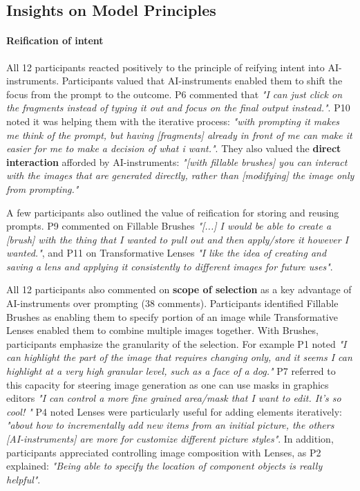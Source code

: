 \subsection{Insights on Model Principles}

\paragraph{\textbf{Reification of intent}} All 12 participants reacted positively to the principle of reifying intent into AI-instruments. Participants valued that AI-instruments enabled them to shift the focus from the prompt to the outcome. P6 commented that \textit{"I can just click on the fragments instead of typing it out and focus on the final output instead."}. P10 noted it was helping them with the iterative process: \textit{"with prompting it makes me think of the prompt, but having [fragments] already in front of me can make it easier for me to make a decision of what i want."}. They also valued the \textbf{direct interaction} afforded by AI-instruments: \textit{"[with fillable brushes] you can interact with the images that are generated directly, rather than [modifying] the image only from prompting."}

A few participants also outlined the value of reification for storing and reusing prompts. P9 commented on Fillable Brushes \textit{"[...] I would be able to create a [brush] with the thing that I wanted to pull out and then apply/store it however I wanted."}, and P11 on Transformative Lenses \textit{"I like the idea of creating and saving a lens and applying it consistently to different images for future uses"}. 

All 12 participants also commented on \textbf{scope of selection} as a key advantage of AI-instruments over prompting (38 comments). Participants identified Fillable Brushes as enabling them to specify portion of an image while Transformative Lenses enabled them to combine multiple images together.  With Brushes, participants emphasize the granularity of the selection. For example P1 noted \textit{"I can highlight the part of the image that requires changing only, and it seems I can highlight at a very high granular level, such as a face of a dog."} P7 referred to this capacity for steering image generation as one can use masks in graphics editors \textit{"I can control a more fine grained area/mask that I want to edit. It's so cool! "}  P4 noted Lenses were particularly useful for adding elements iteratively: \textit{"about how to incrementally add new items from an initial picture, the others [AI-instruments] are more for customize different picture styles"}. In addition, participants appreciated controlling image composition with Lenses, as P2 explained: \textit{"Being able to specify the location of component objects is really helpful"}. 




